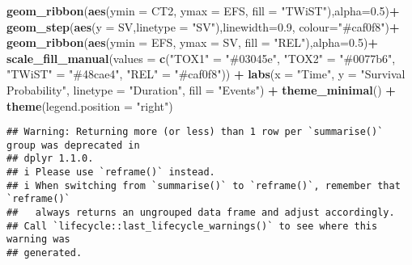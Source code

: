 \documentclass[
]{article}
\newenvironment{Shaded}{\begin{snugshade}}{\end{snugshade}}
\newcommand{\AttributeTok}[1]{\textcolor[rgb]{0.13,0.29,0.53}{#1}}
\newcommand{\DecValTok}[1]{\textcolor[rgb]{0.00,0.00,0.81}{#1}}
\newcommand{\FloatTok}[1]{\textcolor[rgb]{0.00,0.00,0.81}{#1}}
\newcommand{\FunctionTok}[1]{\textcolor[rgb]{0.13,0.29,0.53}{\textbf{#1}}}
\newcommand{\NormalTok}[1]{#1}
\newcommand{\OtherTok}[1]{\textcolor[rgb]{0.56,0.35,0.01}{#1}}
\newcommand{\SpecialCharTok}[1]{\textcolor[rgb]{0.81,0.36,0.00}{\textbf{#1}}}
\newcommand{\StringTok}[1]{\textcolor[rgb]{0.31,0.60,0.02}{#1}}
\begin{document}
\begin{Shaded}
\begin{Highlighting}[]
  \FunctionTok{geom\_ribbon}\NormalTok{(}\FunctionTok{aes}\NormalTok{(}\AttributeTok{ymin =}\NormalTok{ CT2, }\AttributeTok{ymax =}\NormalTok{ EFS, }\AttributeTok{fill =} \StringTok{"TWiST"}\NormalTok{),}\AttributeTok{alpha=}\FloatTok{0.5}\NormalTok{)}\SpecialCharTok{+}
  \FunctionTok{geom\_step}\NormalTok{(}\FunctionTok{aes}\NormalTok{(}\AttributeTok{y =}\NormalTok{ SV,}\AttributeTok{linetype =} \StringTok{"SV"}\NormalTok{),}\AttributeTok{linewidth=}\FloatTok{0.9}\NormalTok{, }\AttributeTok{colour=}\StringTok{"\#caf0f8"}\NormalTok{)}\SpecialCharTok{+}
  \FunctionTok{geom\_ribbon}\NormalTok{(}\FunctionTok{aes}\NormalTok{(}\AttributeTok{ymin =}\NormalTok{ EFS, }\AttributeTok{ymax =}\NormalTok{ SV, }\AttributeTok{fill =} \StringTok{"REL"}\NormalTok{),}\AttributeTok{alpha=}\FloatTok{0.5}\NormalTok{)}\SpecialCharTok{+}
  \FunctionTok{scale\_fill\_manual}\NormalTok{(}\AttributeTok{values =} \FunctionTok{c}\NormalTok{(}\StringTok{"TOX1"} \OtherTok{=} \StringTok{"\#03045e"}\NormalTok{, }\StringTok{"TOX2"} \OtherTok{=} \StringTok{"\#0077b6"}\NormalTok{, }\StringTok{"TWiST"} \OtherTok{=} \StringTok{"\#48cae4"}\NormalTok{, }\StringTok{"REL"} \OtherTok{=} \StringTok{"\#caf0f8"}\NormalTok{)) }\SpecialCharTok{+}
  \FunctionTok{labs}\NormalTok{(}\AttributeTok{x =} \StringTok{"Time"}\NormalTok{, }\AttributeTok{y =} \StringTok{"Survival Probability"}\NormalTok{, }\AttributeTok{linetype =} \StringTok{"Duration"}\NormalTok{, }\AttributeTok{fill =} \StringTok{"Events"}\NormalTok{) }\SpecialCharTok{+}
  \FunctionTok{theme\_minimal}\NormalTok{() }\SpecialCharTok{+}
  \FunctionTok{theme}\NormalTok{(}\AttributeTok{legend.position =} \StringTok{"right"}\NormalTok{)}
\end{Highlighting}
\end{Shaded}

\begin{verbatim}
## Warning: Returning more (or less) than 1 row per `summarise()` group was deprecated in
## dplyr 1.1.0.
## i Please use `reframe()` instead.
## i When switching from `summarise()` to `reframe()`, remember that `reframe()`
##   always returns an ungrouped data frame and adjust accordingly.
## Call `lifecycle::last_lifecycle_warnings()` to see where this warning was
## generated.
\end{verbatim}

\begin{Shaded}
\end{Shaded}
\end{document}
